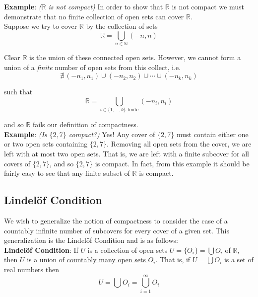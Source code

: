 \documentclass[12pt]{article}
\newlength\tindent
\renewcommand{\indent}{\hspace*{\tindent}}
\newcommand{\R}{\mathbb R}
\newcommand{\N}{\mathbb N}
\begin{document}
{\bf Example}: {\em ($\R$ is not compact)} In order to show that $\R$ is not compact we must demonstrate that no finite collection of open sets can cover $\R$. \\

Suppose we try to cover $\R$ by the collection of sets
\begin{equation*}
	\R = \bigcup_{n\in\N} (-n, n)
\end{equation*}

Clear $\R$ is the union of these connected open sets. However, we cannot form a union of a {\em finite} number of open sets from this collect, i.e.
\begin{equation*}
	\nexists\, (-n_1, n_1) \cup (-n_2, n_2) \cup \cdots \cup (-n_k, n_k)
\end{equation*}

such that
\begin{equation*}
	\R = \bigcup_{i\in\{1,...,k\} \text{ finite}} (-n_i, n_i)
\end{equation*}

and so $\R$ fails our definition of compactness. \\

{\bf Example}: {\em (Is $\{2,7\}$ compact?)} Yes! Any cover of $\{2, 7\}$ must contain either one or two open sets containing $\{2, 7\}$. Removing all open sets from the cover, we are left with at most two open sets. That is, we are left with a finite subcover for all covers of $\{2, 7\}$, and so $\{2, 7\}$ is compact. In fact, from this example it should be fairly easy to see that any finite subset of $\R$ is compact. \\

\subsection{Lindel\"{o}f Condition}

\indent We wish to generalize the notion of compactness to consider the case of a countably infinite number of subcovers for every cover of a given set. This generalization is the Lindel\"{o}f Condition and is as follows: \\

{\bf Lindel\"{o}f Condition}: If $U$ is a collection of open sets $U = \{O_i\} = \bigcup O_i$ of $\R$, then $U$ is a union of \underline{countably many open sets $O_i$}. That is, if $U = \bigcup O_i$ is a set of real numbers then
\begin{equation*}
	U = \bigcup O_i = \bigcup^\infty_{i = 1} O_i
\end{equation*}
\end{document}
